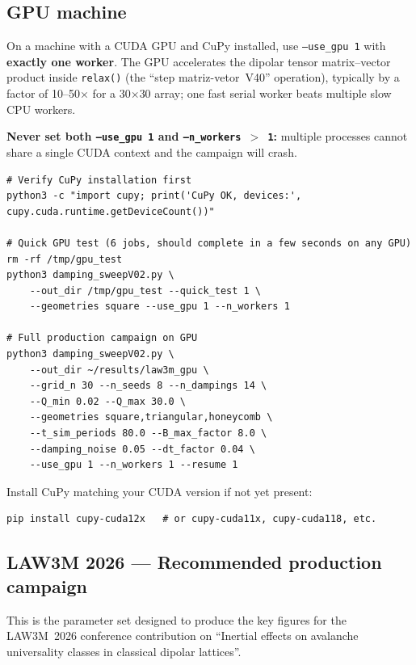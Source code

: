 \documentclass[11pt,a4paper]{article}
\newcommand{\code}[1]{\texttt{#1}}
\newcommand{\param}[1]{\texttt{--#1}}
\newcommand{\warn}[1]{\textcolor{warnorange}{\textbf{#1}}}
\begin{document}
\subsection{GPU machine}
\label{sec:gpu}

On a machine with a CUDA GPU and CuPy installed, use \param{use\_gpu~1}
with \textbf{exactly one worker}.  The GPU accelerates the dipolar
tensor matrix--vector product inside \code{relax()} (the ``step
matriz-vetor~V40'' operation), typically by a factor of 10--50$\times$
for a 30$\times$30 array; one fast serial worker beats multiple slow
CPU workers.

\warn{Never set both \texttt{--use\_gpu~1} and \texttt{--n\_workers~$>$~1}:}
multiple processes cannot share a single CUDA context and the campaign
will crash.

\begin{lstlisting}
# Verify CuPy installation first
python3 -c "import cupy; print('CuPy OK, devices:', cupy.cuda.runtime.getDeviceCount())"

# Quick GPU test (6 jobs, should complete in a few seconds on any GPU)
rm -rf /tmp/gpu_test
python3 damping_sweepV02.py \
    --out_dir /tmp/gpu_test --quick_test 1 \
    --geometries square --use_gpu 1 --n_workers 1

# Full production campaign on GPU
python3 damping_sweepV02.py \
    --out_dir ~/results/law3m_gpu \
    --grid_n 30 --n_seeds 8 --n_dampings 14 \
    --Q_min 0.02 --Q_max 30.0 \
    --geometries square,triangular,honeycomb \
    --t_sim_periods 80.0 --B_max_factor 8.0 \
    --damping_noise 0.05 --dt_factor 0.04 \
    --use_gpu 1 --n_workers 1 --resume 1
\end{lstlisting}

\noindent Install CuPy matching your CUDA version if not yet present:
\begin{lstlisting}
pip install cupy-cuda12x   # or cupy-cuda11x, cupy-cuda118, etc.
\end{lstlisting}

\subsection{LAW3M 2026 --- Recommended production campaign}
\label{sec:law3m}

This is the parameter set designed to produce the key figures for the
LAW3M~2026 conference contribution on ``Inertial effects on avalanche
universality classes in classical dipolar lattices''.
\end{document}
